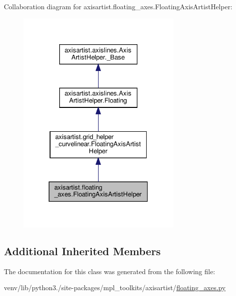 Collaboration diagram for axisartist.\+floating\+\_\+axes.\+Floating\+Axis\+Artist\+Helper\+:
\nopagebreak
\begin{figure}[H]
\begin{center}
\leavevmode
\includegraphics[width=232pt]{classaxisartist_1_1floating__axes_1_1FloatingAxisArtistHelper__coll__graph}
\end{center}
\end{figure}
\subsection*{Additional Inherited Members}


The documentation for this class was generated from the following file\+:\begin{DoxyCompactItemize}
\item 
venv/lib/python3./site-\/packages/mpl\+\_\+toolkits/axisartist/\hyperlink{axisartist_2floating__axes_8py}{floating\+\_\+axes.\+py}\end{DoxyCompactItemize}
